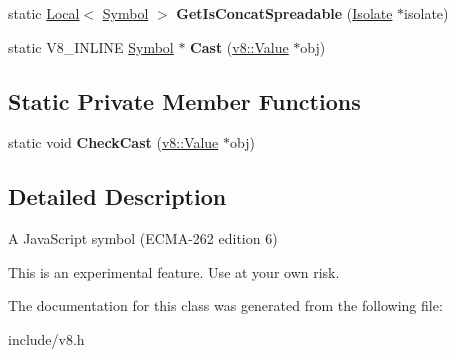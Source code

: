 \begin{DoxyCompactItemize}
\item 
static \hyperlink{classv8_1_1_local}{Local}$<$ \hyperlink{classv8_1_1_symbol}{Symbol} $>$ {\bfseries Get\+Is\+Concat\+Spreadable} (\hyperlink{classv8_1_1_isolate}{Isolate} $\ast$isolate)\hypertarget{classv8_1_1_symbol_acf0d506838dbf518537c17a72571c0bf}{}\label{classv8_1_1_symbol_acf0d506838dbf518537c17a72571c0bf}

\item 
static V8\+\_\+\+I\+N\+L\+I\+NE \hyperlink{classv8_1_1_symbol}{Symbol} $\ast$ {\bfseries Cast} (\hyperlink{classv8_1_1_value}{v8\+::\+Value} $\ast$obj)\hypertarget{classv8_1_1_symbol_a6bb214df5e2d8655379a648530aebaf1}{}\label{classv8_1_1_symbol_a6bb214df5e2d8655379a648530aebaf1}

\end{DoxyCompactItemize}
\subsection*{Static Private Member Functions}
\begin{DoxyCompactItemize}
\item 
static void {\bfseries Check\+Cast} (\hyperlink{classv8_1_1_value}{v8\+::\+Value} $\ast$obj)\hypertarget{classv8_1_1_symbol_aa323c1373809a7f2f6ffa9be34e81f5e}{}\label{classv8_1_1_symbol_aa323c1373809a7f2f6ffa9be34e81f5e}

\end{DoxyCompactItemize}


\subsection{Detailed Description}
A Java\+Script symbol (E\+C\+M\+A-\/262 edition 6)

This is an experimental feature. Use at your own risk. 

The documentation for this class was generated from the following file\+:\begin{DoxyCompactItemize}
\item 
include/v8.\+h\end{DoxyCompactItemize}
